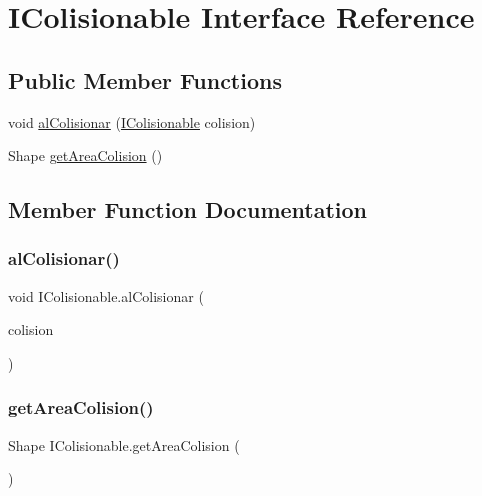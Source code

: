 \hypertarget{interface_i_colisionable}{}\section{I\+Colisionable Interface Reference}
\label{interface_i_colisionable}
\subsection*{Public Member Functions}
\begin{DoxyCompactItemize}
\item 
void \mbox{\hyperlink{interface_i_colisionable_a841772456b4b97c231abdf7e2377710f}{al\+Colisionar}} (\mbox{\hyperlink{interface_i_colisionable}{I\+Colisionable}} colision)
\item 
Shape \mbox{\hyperlink{interface_i_colisionable_ab1e0febd27f07aa60c7bda4737599db9}{get\+Area\+Colision}} ()
\end{DoxyCompactItemize}


\subsection{Member Function Documentation}
\mbox{\label{interface_i_colisionable_a841772456b4b97c231abdf7e2377710f}} 
\subsubsection{\texorpdfstring{al\+Colisionar()}{alColisionar()}}
{\footnotesize\ttfamily void I\+Colisionable.\+al\+Colisionar (\begin{DoxyParamCaption}\item[{\mbox{\hyperlink{interface_i_colisionable}{I\+Colisionable}}}]{colision }\end{DoxyParamCaption})}

\mbox{\label{interface_i_colisionable_ab1e0febd27f07aa60c7bda4737599db9}} 
\subsubsection{\texorpdfstring{get\+Area\+Colision()}{getAreaColision()}}
{\footnotesize\ttfamily Shape I\+Colisionable.\+get\+Area\+Colision (\begin{DoxyParamCaption}{ }\end{DoxyParamCaption})}

